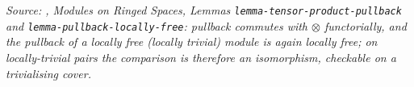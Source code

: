 \begin{lemma}
  \textit{Source: \cite{stacks-project}, Modules on Ringed Spaces, Lemmas
  \texttt{lemma-tensor-product-pullback} and \texttt{lemma-pullback-locally-free}:
  pullback commutes with \(\otimes\) functorially, and the pullback of a locally free
  (locally trivial) module is again locally free; on locally-trivial pairs the comparison
  is therefore an isomorphism, checkable on a trivialising cover.}
\end{lemma}

